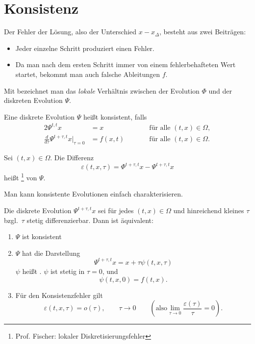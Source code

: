 \section{Konsistenz}

Der Fehler der Lösung, also der Unterschied $x - x_\Delta$, besteht aus zwei Beiträgen:
\begin{itemize}
 \item Jeder einzelne Schritt produziert einen Fehler.
 \item Da man nach dem ersten Schritt immer von einem fehlerbehafteten Wert startet, bekommt
  man auch falsche Ableitungen $f$.
\end{itemize}

Mit  bezeichnet man das \textit{lokale} Verhältnis zwischen der Evolution $\Phi$ und der diskreten Evolution $\Psi$.
\begin{defi}
	Eine diskrete Evolution $\Psi$ heißt konsistent, falls
	\begin{alignat*}{2}
		\Psi^{t,t} x & =x &\qquad & \text{für alle $(t,x) \in \Omega$}, \\
		\frac{d}{d \tau} \Psi^{t+\tau,t} x \Big|_{\tau=0} & =f(x,t)
		&& \text{für alle $(t,x) \in \Omega$}.
	\end{alignat*}
\end{defi}

\begin{defi}
	Sei $(t,x) \in \Omega$. Die Differenz 
	\begin{equation*}
		\varepsilon (t,x,\tau)=\Phi^{t+\tau,t} x-\Psi^{t+\tau,t} x
	\end{equation*}
	heißt \footnote{Prof. Fischer: lokaler Diskretisierungsfehler} von $\Psi$.
\end{defi}

Man kann konsistente Evolutionen einfach charakterisieren.

\begin{lemma}
	Die diskrete Evolution $\Psi^{t+\tau,t} x$ sei für jedes $(t,x) \in \Omega$ und hinreichend kleines $\tau$
	bzgl.\ $\tau$ stetig differenzierbar. Dann ist äquivalent:
	\begin{enumerate}
		\item $\Psi$ ist konsistent
		\item $\Psi$ hat die Darstellung
		\begin{equation*}
			\Psi^{t+\tau,t} x=x+\tau \psi (t,x,\tau )
		\end{equation*}
		$\psi$ heißt . $\psi$ ist stetig in $\tau = 0$, und
		\begin{equation*}
			\psi (t,x,0)=f(t,x).
		\end{equation*}
		
		\item Für den Konsistenzfehler gilt
		\begin{equation*}
			\varepsilon (t,x,\tau)=o (\tau),
			\qquad
			\tau \to 0
			\qquad
			(\text{also} \lim_{\tau \to 0} \frac{\varepsilon (\tau)}{\tau}=0 ).
		\end{equation*}
	\end{enumerate}
\end{lemma}

